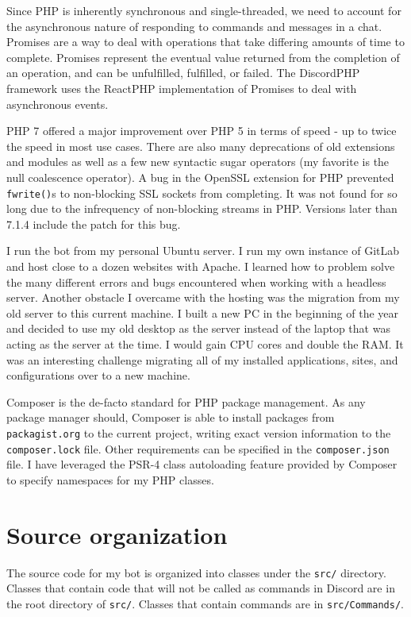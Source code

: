 \documentclass[12pt]{article} %
\begin{document}
Since PHP is inherently synchronous and single-threaded, we need to account for the asynchronous nature of responding to commands and messages in a chat. Promises are a way to deal with operations that take differing amounts of time to complete. Promises represent the eventual value returned from the completion of an operation, and can be unfulfilled, fulfilled, or failed. The DiscordPHP framework uses the ReactPHP implementation of Promises to deal with asynchronous events.

PHP 7 offered a major improvement over PHP 5 in terms of speed - up to twice the speed in most use cases. There are also many deprecations of old extensions and modules as well as a few new syntactic sugar operators (my favorite is the null coalescence operator). A bug in the OpenSSL extension for PHP prevented \verb|fwrite()|s to non-blocking SSL sockets from completing. It was not found for so long due to the infrequency of non-blocking streams in PHP. Versions later than 7.1.4 include the patch for this bug.

I run the bot from my personal Ubuntu server. I run my own instance of GitLab and host close to a dozen websites with Apache. I learned how to problem solve the many different errors and bugs encountered when working with a headless server. Another obstacle I overcame with the hosting was the migration from my old server to this current machine. I built a new PC in the beginning of the year and decided to use my old desktop as the server instead of the laptop that was acting as the server at the time. I would gain CPU cores and double the RAM. It was an interesting challenge migrating all of my installed applications, sites, and configurations over to a new machine.

Composer is the de-facto standard for PHP package management. As any package manager should, Composer is able to install packages from \verb|packagist.org| to the current project, writing exact version information to the \verb|composer.lock| file. Other requirements can be specified in the \verb|composer.json| file. I have leveraged the PSR-4 class autoloading feature provided by Composer to specify namespaces for my PHP classes.


\section*{Source organization}

The source code for my bot is organized into classes under the \verb|src/| directory. Classes that contain code that will not be called as commands in Discord are in the root directory of \verb|src/|. Classes that contain commands are in \verb|src/Commands/|.
\end{document}
